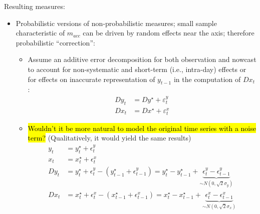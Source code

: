 \documentclass[oneside]{article}
\theoremstyle{plain}%
\theoremstyle{definition}
\newcommand{\ind}[1]{\mathbbm{1}\{#1\}}
\newcommand{\ydiff}{D y}
\newcommand{\ydifft}{Dy^\star}
\newcommand{\xdiff}{Dx}
\newcommand{\xdifft}{Dx^\star}
\begin{document}
Resulting measures:
\begin{itemize}

\item Probabilistic versions of non-probabilistic measures; small sample characteristic of $m_{acc}$ can be driven by random effects near the axis; therefore probabilistic \enquote{correction}:
\begin{itemize}
  \item Assume an additive error decomposition for both observation and nowcast to account for non-systematic and short-term (i.e., intra-day) effects or for effects on inaccurate representation of $y_{t-1}$ in the computation of $Dx_t$:
  	\begin{align}\label{additive error decomposition}
  		\ydiff_t &= \ydifft + \varepsilon_t^y \\
  		\xdiff_t &= \xdifft + \varepsilon_t^x
	\end{align}
 \item \hl{Wouldn't it be more natural to model the original time series with a noise term?} (Qualitatively, it would yield the same results)
 \begin{align}
     y_t &= y_t^\star + \epsilon_t^y \\
     x_t &= x_t^\star + \epsilon_t^x \\
     \ydiff_t &= y_t^\star + \epsilon_t^y - (y_{t-1}^\star + \epsilon_{t-1}^y) = y_t^\star - y_{t-1}^\star + \underbrace{\epsilon_t^y - \epsilon_{t-1}^y}_{\sim N(0, \sqrt{2} \sigma_y)} \\
     \xdiff_t &= x_t^\star + \epsilon_t^x - (x_{t-1}^\star + \epsilon_{t-1}^x) = x_t^\star - x_{t-1}^\star + \underbrace{\epsilon_t^x - \epsilon_{t-1}^x}_{\sim N(0, \sqrt{2} \sigma_x)}

\end{align}
\end{itemize}
\end{itemize}
\end{document}
